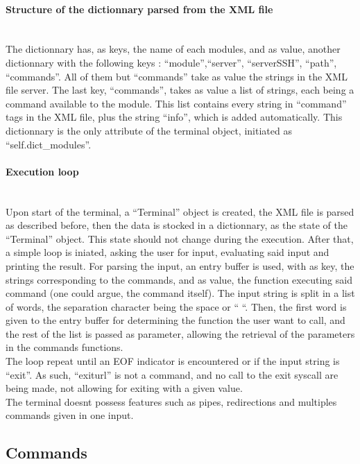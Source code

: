 \paragraph{Structure of the dictionnary parsed from the XML file} \hspace{0pt} \\
The dictionnary has, as keys, the name of each modules, and as value, another dictionnary with the following keys : ``module'',``server'', ``serverSSH'', ``path'', ``commands''. All of them but ``commands'' take as value the strings in the XML file server. The last key, ``commands'', takes as value a list of strings, each being a command available to the module. This list contains every string in ``command'' tags in the XML file, plus the string ``info'', which is added automatically. This dictionnary is the only attribute of the terminal object, initiated as ``self.dict\_modules''.

\paragraph{Execution loop} \hspace{0pt} \\

Upon start of the terminal, a ``Terminal'' object is created, the XML file is parsed as described before, then the data is stocked in a dictionnary, as the state of the ``Terminal'' object. This state should not change during the execution. After that, a simple loop is iniated, asking the user for input, evaluating said input and printing the result. For parsing the input, an entry buffer is used, with as key, the strings corresponding to the commands, and as value, the function executing said command (one could argue, the command itself). The input string is split in a list of words, the separation character being the space or `` ``. Then, the first word is given to the entry buffer for determining the function the user want to call, and the rest of the list is passed as parameter, allowing the retrieval of the parameters in the commands functions. \\
The loop repeat until an EOF indicator is encountered or if the input string is ``exit''. As such, ``exiturl'' is not a command, and no call to the exit syscall are being made, not allowing for exiting with a given value. \\
The terminal doesnt possess features such as pipes, redirections and multiples commands given in one input.

\subsection{Commands}

